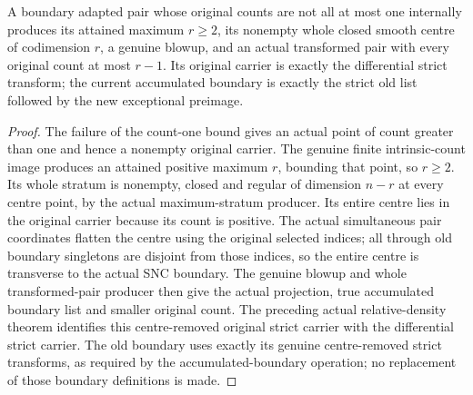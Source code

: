 \begin{lemma}
\label{hir:general-nc-actual-higher-separation-step}
\leanok
{}
A boundary adapted pair whose original counts are not all at most
one internally produces its attained maximum $r\ge2$, its nonempty
whole closed smooth centre of codimension $r$, a genuine blowup, and
an actual transformed pair with every original count at most $r-1$.
Its original carrier is exactly the differential strict transform;
the current accumulated boundary is exactly the strict old list
followed by the new exceptional preimage.
\end{lemma}
\begin{proof}
The failure of the count-one bound gives an actual point of count
greater than one and hence a nonempty original carrier. The genuine
finite intrinsic-count image produces an attained positive maximum
$r$, bounding that point, so $r\ge2$. Its whole stratum is nonempty,
closed and regular of dimension $n-r$ at every centre point, by the
actual maximum-stratum producer. Its entire centre lies in the
original carrier because its count is positive. The actual simultaneous
pair coordinates flatten the centre using the original selected indices;
all through old boundary singletons are disjoint from those indices,
so the entire centre is transverse to the actual SNC boundary.
The genuine blowup and whole
transformed-pair producer then give the actual projection, true
accumulated boundary list and smaller original count. The preceding
actual relative-density theorem identifies this centre-removed
original strict carrier with the differential strict carrier.
The old boundary uses exactly its genuine centre-removed strict
transforms, as required by the accumulated-boundary operation; no
replacement of those boundary definitions is made.
\end{proof}

